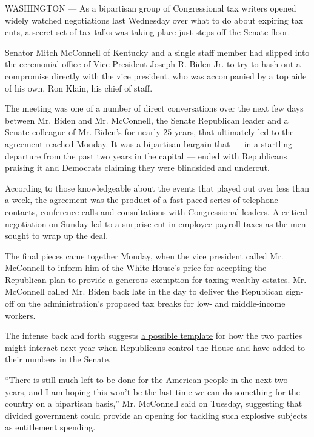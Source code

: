 WASHINGTON --- As a bipartisan group of Congressional tax writers opened
widely watched negotiations last Wednesday over what to do about
expiring tax cuts, a secret set of tax talks was taking place just steps
off the Senate floor.

Senator Mitch McConnell of Kentucky and a single staff member had
slipped into the ceremonial office of Vice President Joseph R. Biden Jr.
to try to hash out a compromise directly with the vice president, who
was accompanied by a top aide of his own, Ron Klain, his chief of staff.

The meeting was one of a number of direct conversations over the next
few days between Mr. Biden and Mr. McConnell, the Senate Republican
leader and a Senate colleague of Mr. Biden's for nearly 25 years, that
ultimately led to
\href{http://bucks.blogs.nytimes3xbfgragh.onion/2010/12/07/what-the-tax-deal-means-for-you/?ref=politics}{the
agreement} reached Monday. It was a bipartisan bargain that --- in a
startling departure from the past two years in the capital --- ended
with Republicans praising it and Democrats claiming they were blindsided
and undercut.

According to those knowledgeable about the events that played out over
less than a week, the agreement was the product of a fast-paced series
of telephone contacts, conference calls and consultations with
Congressional leaders. A critical negotiation on Sunday led to a
surprise cut in employee payroll taxes as the men sought to wrap up the
deal.

The final pieces came together Monday, when the vice president called
Mr. McConnell to inform him of the White House's price for accepting the
Republican plan to provide a generous exemption for taxing wealthy
estates. Mr. McConnell called Mr. Biden back late in the day to deliver
the Republican sign-off on the administration's proposed tax breaks for
low- and middle-income workers.

The intense back and forth suggests
\href{http://www.nytimes3xbfgragh.onion/2010/12/07/us/politics/07assess.html}{a
possible template} for how the two parties might interact next year when
Republicans control the House and have added to their numbers in the
Senate.

``There is still much left to be done for the American people in the
next two years, and I am hoping this won't be the last time we can do
something for the country on a bipartisan basis,'' Mr. McConnell said on
Tuesday, suggesting that divided government could provide an opening for
tackling such explosive subjects as entitlement spending.


